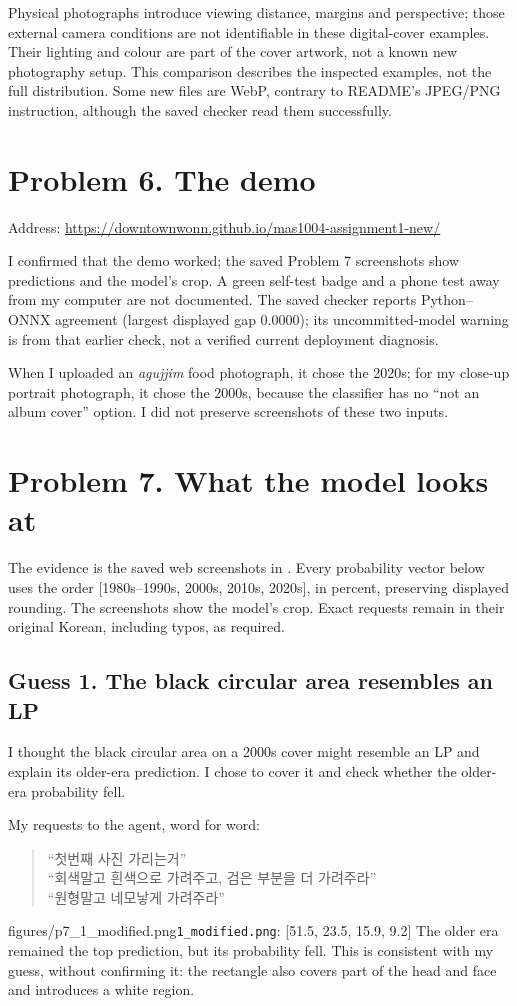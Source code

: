 \documentclass[11pt]{article}
\begin{document}
Physical photographs introduce viewing distance, margins and perspective; those external camera conditions are not identifiable in these digital-cover examples. Their lighting and colour are part of the cover artwork, not a known new photography setup. This comparison describes the inspected examples, not the full distribution. Some new files are WebP, contrary to README's JPEG/PNG instruction, although the saved checker read them successfully.

\section*{Problem 6. The demo}
Address: \url{https://downtownwonn.github.io/mas1004-assignment1-new/}

I confirmed that the demo worked; the saved Problem 7 screenshots show predictions and the model's crop. A green self-test badge and a phone test away from my computer are not documented. The saved checker reports Python--ONNX agreement (largest displayed gap 0.0000); its uncommitted-model warning is from that earlier check, not a verified current deployment diagnosis.

When I uploaded an \emph{agujjim} food photograph, it chose the 2020s; for my close-up portrait photograph, it chose the 2000s, because the classifier has no ``not an album cover'' option. I did not preserve screenshots of these two inputs.

\section*{Problem 7. What the model looks at}
The evidence is the saved web screenshots in . Every probability vector below uses the order [1980s--1990s, 2000s, 2010s, 2020s], in percent, preserving displayed rounding. The screenshots show the model's crop. Exact requests remain in their original Korean, including typos, as required.

\subsection*{Guess 1. The black circular area resembles an LP}
I thought the black circular area on a 2000s cover might resemble an LP and explain its older-era prediction. I chose to cover it and check whether the older-era probability fell.

My requests to the agent, word for word:
\begin{quote}
“첫번째 사진 가리는거”\\
“회색말고 흰색으로 가려주고, 검은 부분을 더 가려주라”\\
“원형말고 네모낳게 가려주라”
\end{quote}
{figures/p7_1_modified.png}{\texttt{1\_modified.png}: [51.5, 23.5, 15.9, 9.2]}
The older era remained the top prediction, but its probability fell. This is consistent with my guess, without confirming it: the rectangle also covers part of the head and face and introduces a white region.
\end{document}
